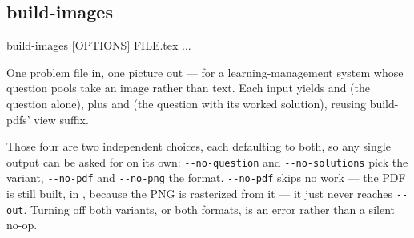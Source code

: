 \subsection*{build-images}

\begin{manexsource}
build-images [OPTIONS] FILE.tex ...
\end{manexsource}

One problem file in, one picture out --- for a learning-management system whose
question pools take an image rather than text. Each input yields
 and  (the question alone), plus
 and  (the question with its
worked solution), reusing build-pdfs' view suffix.

Those four are two independent choices, each defaulting to both, so any single
output can be asked for on its own: \texttt{-{}-no-question} and
\texttt{-{}-no-solutions} pick the variant, \texttt{-{}-no-pdf} and
\texttt{-{}-no-png} the format. \texttt{-{}-no-pdf} skips no work --- the PDF is
still built, in , because the PNG is rasterized from it --- it just
never reaches \texttt{-{}-out}. Turning off both variants, or both formats, is an
error rather than a silent no-op.

